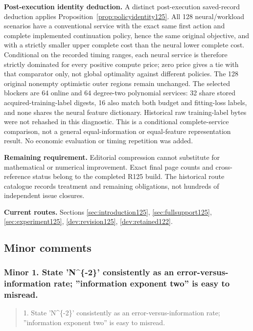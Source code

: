 \noindent\textbf{Post-execution identity deduction.} A distinct post-execution saved-record deduction applies Proposition~\ref{prop:policyidentity125}. All 128 neural/workload scenarios have a conventional service with the exact same first action and complete implemented continuation policy, hence the same original objective, and with a strictly smaller upper complete cost than the neural lower complete cost. Conditional on the recorded timing ranges, each neural service is therefore strictly dominated for every positive compute price; zero price gives a tie with that comparator only, not global optimality against different policies. The 128 original nonempty optimistic outer regions remain unchanged. The selected blockers are 64 online and 64 degree-two polynomial services: 32 share stored acquired-training-label digests, 16 also match both budget and fitting-loss labels, and none shares the neural feature dictionary. Historical raw training-label bytes were not rehashed in this diagnostic. This is a conditional complete-service comparison, not a general equal-information or equal-feature representation result. No economic evaluation or timing repetition was added.

\noindent\textbf{Remaining requirement.} Editorial compression cannot substitute for mathematical or numerical improvement. Exact final page counts and cross-reference status belong to the completed R125 build. The historical route catalogue records treatment and remaining obligations, not hundreds of independent issue closures.

\noindent\textbf{Current routes.} Sections \ref{sec:introduction125}, \ref{sec:fullsupport125}, \ref{sec:experiment125}, \ref{dev:revision125}, \ref{dev:retained122}.

\subsection{Minor comments}

\subsubsection{Minor 1. State 'N\textasciicircum{}\{-2\}' consistently as an error-versus-information rate; ''information exponent two'' is easy to misread.}

\begin{quote}\small
1. State 'N\textasciicircum{}\{-2\}' consistently as an error-versus-information rate; ''information exponent two'' is easy to misread.
\end{quote}

